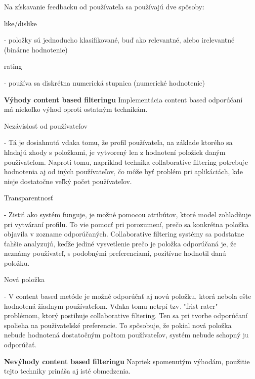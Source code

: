 Na získavanie feedbacku od používateľa sa používajú dve spôsoby: 
\begin{itemize}[leftmargin=*]
	{\bf \item like/dislike} - položky sú jednoducho klasifikované, buď ako relevantné, alebo irelevantné (binárne hodnotenie)  
	{\bf \item rating} - používa sa diskrétna numerická stupnica (numerické hodnotenie) \\
\end{itemize}

{\bf \large Výhody content based filteringu} \newline
	Implementácia content based odporúčaní má niekoľko výhod oproti ostatným technikám. 

\begin{itemize}[leftmargin=*]
	{\bf \item Nezávislosť od používateľov} - Tá je dosiahnutá vďaka tomu, že profil používateľa, na základe ktorého sa hladajú zhody s položkami, je vytvorený len z hodnotení položiek daným používateľom. Naproti tomu, napríklad technika collaborative filtering potrebuje hodnotenia aj od iných používateľov, čo môže byť problém pri aplikáciách, kde nieje dostatočne veľký počet používateľov.
	{\bf \item Transparentnosť} - Zistiť ako systém funguje, je možné pomocou atribútov, ktoré model zohladňuje pri vytváraní profilu. To vie pomocť pri porozumení, prečo sa konkrétna položka objavila v zozname odporúčaných. Collaborative filtering systémy sa podstatne ťahšie analyzujú, keďže jediné vysvetlenie prečo je položka odporúčaná je, že neznámy používateľ, s podobnými preferenciami, pozitívne hodnotil danú položku.
	{\bf \item Nová položka} - V content based metóde je možné odporúčať aj novú položku, ktorá nebola ešte hodnotená žiadnym používateľom. Vďaka tomu netrpí tzv. "frist-rater" problémom, ktorý postihuje collaborative filtering. Ten sa pri tvorbe odporúčaní spolieha na použivateľské preferencie. To spôsobuje, že pokial nová položka nebude hodnotená dostatočným počtom používateľov, systém nebude schopný ju odporúčať. \\
\end{itemize}


{\bf \large Nevýhody content based filteringu} \newline
	Napriek spomenutým výhodám, použitie tejto techniky prináša aj isté obmedzenia. 

